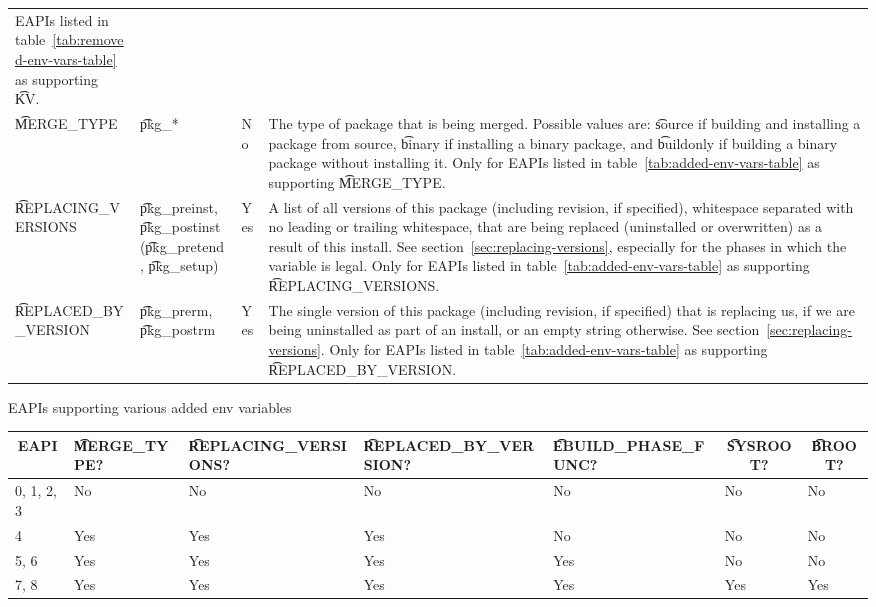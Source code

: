 \begin{landscape}
\begin{longtable}{l P{7em} l p{\mycolwidth}}
    EAPIs listed in table~\ref{tab:removed-env-vars-table} as supporting \t{KV}. \\
\t{MERGE_TYPE} &
    \t{pkg_*} &
    No &
     The type of package that is being merged. Possible values are:
    \t{source} if building and installing a package from source, \t{binary} if installing a binary
    package, and \t{buildonly} if building a binary package without installing it. Only for EAPIs
    listed in table~\ref{tab:added-env-vars-table} as supporting \t{MERGE_TYPE}. \\
\t{REPLACING_VERSIONS} &
    \t{pkg_preinst}, \t{pkg_postinst} (\t{pkg_pretend}, \t{pkg_setup}) &
    Yes &
    A list of all versions of this package (including revision, if specified), whitespace separated
    with no leading or trailing whitespace, that are being replaced (uninstalled or overwritten)
    as a result of this install. See section~\ref{sec:replacing-versions}, especially for the phases
    in which the variable is legal. Only for EAPIs listed in table~\ref{tab:added-env-vars-table}
    as supporting \t{REPLACING_VERSIONS}. \\
\t{REPLACED_BY_VERSION} &
    \t{pkg_prerm}, \t{pkg_postrm} &
    Yes &
    The single version of this package (including revision, if specified) that is replacing us,
    if we are being uninstalled as part of an install, or an empty string otherwise.
    See section~\ref{sec:replacing-versions}. Only for EAPIs listed in
    table~\ref{tab:added-env-vars-table} as supporting \t{REPLACED_BY_VERSION}. \\
\end{longtable}
\end{landscape}

\begin{centertable}{EAPIs supporting various added env variables}
    \label{tab:added-env-vars-table}
    \begin{tabular}{lllllll}
      \toprule
      \multicolumn{1}{c}{\textbf{EAPI}} &
      \multicolumn{1}{P{3.25em}}{\textbf{\t{MERGE_TYPE}?}} &
      \multicolumn{1}{P{5.25em}}{\textbf{\t{REPLACING_VERSIONS}?}} &
      \multicolumn{1}{P{5.75em}}{\textbf{\t{REPLACED_BY_VERSION}?}} &
      \multicolumn{1}{P{5.75em}}{\textbf{\t{EBUILD_PHASE_FUNC}?}} &
      \multicolumn{1}{c}{\textbf{\t{SYSROOT}?}} &
      \multicolumn{1}{c}{\textbf{\t{BROOT}?}} \\
      \midrule
      0, 1, 2, 3        & No  & No  & No  & No  & No  & No  \\
      4                 & Yes & Yes & Yes & No  & No  & No  \\
      5, 6              & Yes & Yes & Yes & Yes & No  & No  \\
      7, 8              & Yes & Yes & Yes & Yes & Yes & Yes \\
      \bottomrule
    \end{tabular}
\end{centertable}

